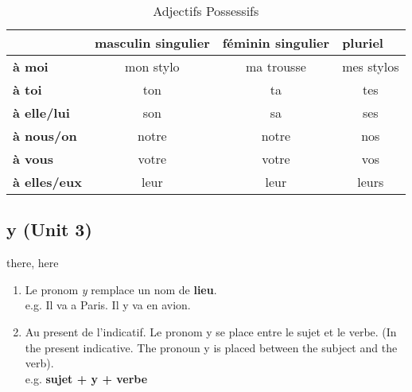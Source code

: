 \documentclass[10pt,a4paper,twoside]{article} %
\begin{document}
\begin{table}[h]
\centering
\begin{tabular}{|l|c|c|c|}
\hline
\multicolumn{1}{|c|}{\textbf{}} & \textbf{masculin singulier} & \multicolumn{1}{l|}{\textbf{féminin singulier}} & \multicolumn{1}{l|}{\textbf{pluriel}} \\ \hline
\textbf{à moi}                  & mon stylo                   & ma trousse                                      & mes stylos                            \\ \hline
\textbf{à toi}                  & ton                         & ta                                              & tes                                   \\ \hline
\textbf{à elle/lui}             & son                         & sa                                              & ses                                   \\ \hline
\textbf{à nous/on}              & notre                       & notre                                           & nos                                   \\ \hline
\textbf{à vous}                 & votre                       & votre                                           & vos                                   \\ \hline
\textbf{à elles/eux}            & leur                        & leur                                            & leurs                                 \\ \hline
\end{tabular}
\caption{Adjectifs Possessifs}
\label{tab:adjectifs-possessifs}
\end{table}

\subsection*{y (Unit 3)}
\begin{center}
    there, here
\end{center}
\begin{enumerate}
    \item Le pronom \textit{y} remplace un nom de \textbf{lieu}. \\
    e.g. Il va a Paris. Il y va en avion. \\
    \item Au present de l'indicatif. Le pronom y se place entre le sujet et le verbe. (In the present indicative. The pronoun y is placed between the subject and the verb). \\
    e.g. \textbf{sujet + y + verbe}
\end{enumerate}
\end{document}
